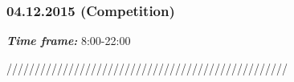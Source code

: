 \subsubsection{04.12.2015 (Competition)}
\textit{\textbf{Time frame:}} 8:00-22:00

//////////////////////////////////////////////////

